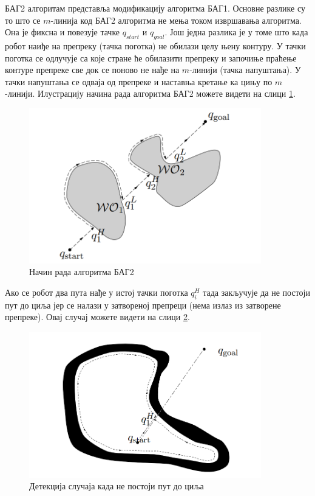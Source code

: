 \documentclass[12pt,oneside]{memoir}
\theoremstyle{remark}
\begin{document}
БАГ2 алгоритам представља модификацију алгоритма БАГ1. Основне разлике су то што се $m$-линија код БАГ2 алгоритма не мења током извршавања алгоритма. Она је фиксна и повезује тачке $q_{start}$ и $q_{goal}$. Још једна разлика је у томе што када робот наиђе на препреку (тачка поготка) не обилази целу њену контуру. У тачки поготка се одлучује са које стране ће обилазити препреку и започиње праћење контуре препреке све док се поново не нађе на $m$-линији (тачка напуштања). У тачки напуштања се одваја од препреке и наставња кретање ка цињу по $m$-линији. Илустрацију начина рада алгоритма БАГ2 можете видети на слици \ref{fig:bug2}.
\begin{figure}[!ht]
\centering
\includegraphics[width=0.9\textwidth]{slike/bug2.png}
\caption{Начин рада алгоритма БАГ2}
\label{fig:bug2}
\end{figure}
Ако се робот два пута нађе у истој тачки поготка $q_i^H$ тада закључује да не постоји пут до циља јер се налази у затвореној препреци (нема излаз из затворене препреке). Овај случај можете видети на слици \ref{fig:bug2f}.

\begin{figure}[!ht]
\centering
\includegraphics[width=0.9\textwidth]{slike/bug2f.png}
\caption{Детекција случаја када не постоји пут до циља}
\label{fig:bug2f}
\end{figure}
\end{document}
